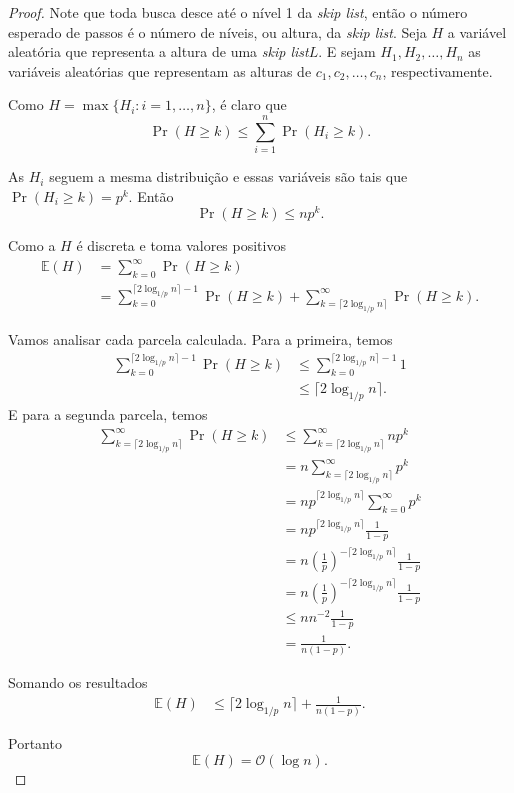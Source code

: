 \documentclass[paper=a4, fontsize=11pt]{scrartcl} %
\numberwithin{equation}{section}
\numberwithin{figure}{section}
\numberwithin{table}{section}
\numberwithin{definition}{section}
\numberwithin{theorem}{section}
\numberwithin{property}{section}
\numberwithin{proposition}{section}
\newcommand{\cO}{\ensuremath{\mathcal{O}}}
\newcommand{\skl}{\textit{skip list}\xspace}
\newcommand{\Exp}{\ensuremath{{\mathbb{E}}}\xspace}
\begin{document}
\begin{proof}

Note que toda busca desce até o nível 1 da \skl, então o número esperado de passos é o número de níveis,
ou altura, da \skl. Seja $H$ a variável aleatória que representa a altura de uma \skl $L$. E sejam 
$H_1, H_2, \ldots, H_n$ as variáveis aleatórias que representam as alturas de $c_1, c_2, \ldots, c_n$, 
respectivamente.

Como $H = \max \{H_i : i = 1, \ldots, n \}$, é claro que
$$
\Pr(H \geq k) \leq \sum_{i=1}^n \Pr(H_i \geq k).
$$

As $H_i$ seguem a mesma distribuição e essas variáveis são tais que $ \Pr(H_i \geq k) = p^k$. Então
$$
\Pr(H \geq k) \leq np^k.
$$

Como a $H$ é discreta e toma valores positivos
\begin{align*}
\Exp(H) &= \sum_{k = 0}^{\infty} \Pr(H \geq k)  \\
        &= \sum_{k = 0}^{\lceil 2 \log_{1/p} n \rceil - 1} \Pr(H \geq k) +
        \sum_{k = \lceil 2 \log_{1/p} n \rceil}^{\infty} \Pr(H \geq k).
\end{align*}

Vamos analisar cada parcela calculada. Para a primeira, temos
\begin{align*}
\sum_{k = 0}^{\lceil 2 \log_{1/p} n \rceil - 1} \Pr(H \geq k) &\leq 
  \sum_{k = 0}^{\lceil 2 \log_{1/p} n \rceil - 1} 1 \\
&\leq \lceil 2 \log_{1/p} n \rceil.
\end{align*}
E para a segunda parcela, temos
\begin{align*}
\sum_{k = \lceil 2 \log_{1/p} n \rceil}^{\infty} \Pr(H \geq k) 
   &\leq \sum_{k = \lceil 2 \log_{1/p} n \rceil}^{\infty} np^k \\
   &= n \sum_{k = \lceil 2 \log_{1/p} n \rceil}^{\infty} p^k \\
   &= n p^{\lceil 2 \log_{1/p} n \rceil} \sum_{k = 0}^{\infty} p^k \\
   &= n p^{\lceil 2 \log_{1/p} n \rceil} \frac{1}{1 - p} \\
   &= n \left( \frac{1}{p} \right)^{- \lceil 2 \log_{1/p} n \rceil} \frac{1}{1 - p} \\
   &= n \left( \frac{1}{p} \right)^{- \lceil 2 \log_{1/p} n \rceil} \frac{1}{1 - p} \\
   &\leq n n^{-2} \frac{1}{1 - p} \\
   &= \frac{1}{n(1 - p)}.
\end{align*}

Somando os resultados
\begin{align*}
\Exp(H) &\leq \lceil 2 \log_{1/p} n \rceil + \frac{1}{n(1 - p)}.
\end{align*}

Portanto
$$
\Exp(H) = \cO(\log n).
$$
\end{proof}
\end{document}
